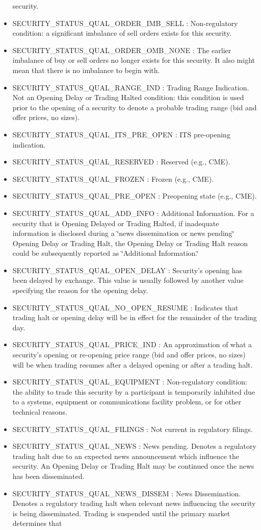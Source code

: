 \begin{itemize}
security. \item SECURITY\_\-STATUS\_\-QUAL\_\-ORDER\_\-IMB\_\-SELL : Non-regulatory condition: a significant imbalance of sell orders exists for this security. \item SECURITY\_\-STATUS\_\-QUAL\_\-ORDER\_\-OMB\_\-NONE : The earlier imbalance of buy or sell orders no longer exists for this security. It also might mean that there is no imbalance to begin with. \item SECURITY\_\-STATUS\_\-QUAL\_\-RANGE\_\-IND : Trading Range Indication. Not an Opening Delay or Trading Halted condition: this condition is used prior to the opening of a security to denote a probable trading range (bid and offer prices, no sizes). \item SECURITY\_\-STATUS\_\-QUAL\_\-ITS\_\-PRE\_\-OPEN : ITS pre-opening indication. \item SECURITY\_\-STATUS\_\-QUAL\_\-RESERVED : Reserved (e.g., CME). \item SECURITY\_\-STATUS\_\-QUAL\_\-FROZEN : Frozen (e.g., CME). \item SECURITY\_\-STATUS\_\-QUAL\_\-PRE\_\-OPEN : Preopening state (e.g., CME). \item SECURITY\_\-STATUS\_\-QUAL\_\-ADD\_\-INFO : Additional Information. For a security that is Opening Delayed or Trading Halted, if inadequate information is disclosed during a \char`\"{}news dissemination or news pending\char`\"{} Opening Delay or Trading Halt, the Opening Delay or Trading Halt reason could be subsequently reported as \char`\"{}Additional Information.\char`\"{} \item SECURITY\_\-STATUS\_\-QUAL\_\-OPEN\_\-DELAY : Security's opening has been delayed by exchange. This value is usually followed by another value specifying the reason for the opening delay. \item SECURITY\_\-STATUS\_\-QUAL\_\-NO\_\-OPEN\_\-RESUME : Indicates that trading halt or opening delay will be in effect for the remainder of the trading day. \item SECURITY\_\-STATUS\_\-QUAL\_\-PRICE\_\-IND : An approximation of what a security's opening or re-opening price range (bid and offer prices, no sizes) will be when trading resumes after a delayed opening or after a trading halt. \item SECURITY\_\-STATUS\_\-QUAL\_\-EQUIPMENT : Non-regulatory condition: the ability to trade this security by a participant is temporarily inhibited due to a systems, equipment or communications facility problem, or for other technical reasons. \item SECURITY\_\-STATUS\_\-QUAL\_\-FILINGS : Not current in regulatory filings. \item SECURITY\_\-STATUS\_\-QUAL\_\-NEWS : News pending. Denotes a regulatory trading halt due to an expected news announcement which influence the security. An Opening Delay or Trading Halt may be continued once the news has been disseminated. \item SECURITY\_\-STATUS\_\-QUAL\_\-NEWS\_\-DISSEM : News Dissemination. Denotes a regulatory trading halt when relevant news influencing the security is being disseminated. Trading is suspended until the primary market determines that 
\end{itemize}
